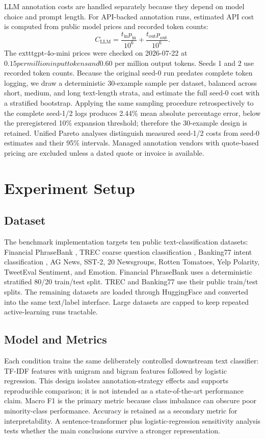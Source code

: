 \documentclass[11pt]{article}
\begin{document}
LLM annotation costs are handled separately because they depend on model choice and prompt length. For API-backed annotation runs, estimated API cost is computed from public model prices and recorded token counts:
\[
  C_{\text{LLM}} = \frac{t_{\text{in}}p_{\text{in}}}{10^6} + \frac{t_{\text{out}}p_{\text{out}}}{10^6}.
\]
The 	exttt{gpt-4o-mini} prices were checked on 2026-07-22 at $0.15 per million input tokens and $0.60 per million output tokens. Seeds 1 and 2 use recorded token counts. Because the original seed-0 run predates complete token logging, we draw a deterministic 30-example sample per dataset, balanced across short, medium, and long text-length strata, and estimate the full seed-0 cost with a stratified bootstrap. Applying the same sampling procedure retrospectively to the complete seed-1/2 logs produces 2.44\% mean absolute percentage error, below the preregistered 10\% expansion threshold; therefore the 30-example design is retained. Unified Pareto analyses distinguish measured seed-1/2 costs from seed-0 estimates and their 95\% intervals. Managed annotation vendors with quote-based pricing are excluded unless a dated quote or invoice is available.

\section{Experiment Setup}

\subsection{Dataset}

The benchmark implementation targets ten public text-classification datasets: Financial PhraseBank \citep{malo2014good}, TREC coarse question classification \citep{li2002learning}, Banking77 intent classification \citep{casanueva2020efficient}, AG News, SST-2, 20 Newsgroups, Rotten Tomatoes, Yelp Polarity, TweetEval Sentiment, and Emotion. Financial PhraseBank uses a deterministic stratified 80/20 train/test split. TREC and Banking77 use their public train/test splits. The remaining datasets are loaded through HuggingFace and converted into the same text/label interface. Large datasets are capped to keep repeated active-learning runs tractable.

\subsection{Model and Metrics}

Each condition trains the same deliberately controlled downstream text classifier: TF-IDF features with unigram and bigram features followed by logistic regression. This design isolates annotation-strategy effects and supports reproducible comparison; it is not intended as a state-of-the-art performance claim. Macro F1 is the primary metric because class imbalance can obscure poor minority-class performance. Accuracy is retained as a secondary metric for interpretability. A sentence-transformer plus logistic-regression sensitivity analysis tests whether the main conclusions survive a stronger representation.
\end{document}
